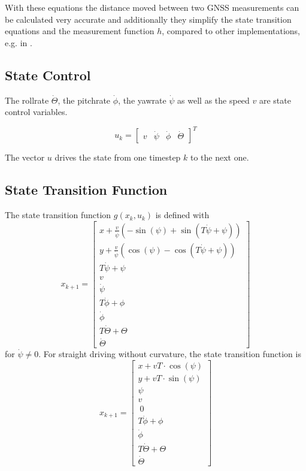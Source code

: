\documentclass[conference]{IEEEtran}
\begin{document}
With these equations the distance moved between two GNSS measurements can be calculated very accurate and additionally they simplify the state transition equations and the measurement function $h$, compared to other implementations, e.g. in \cite{Wender2008a}.

\subsection{State Control}

The rollrate $\dot \Theta$, the pitchrate $\dot \phi$, the yawrate $\dot \psi$ as well as the speed $v$ are state control variables.

\begin{equation}\label{controlinput}u_k=\left[\begin{matrix}v & \dot\psi & \dot\phi & \dot\Theta\end{matrix}\right]^T\end{equation}

The vector $u$ drives the state from one timestep $k$ to the next one.

\subsection{State Transition Function}

The state transition function $g(x_k, u_k)$ is defined with
\begin{equation}\label{statetransitionfunction}
x_{k+1}=\left[\begin{matrix}x + \frac{v}{\dot\psi} \left(- \sin{\left (\psi \right )} + \sin{\left (T \dot\psi + \psi \right )}\right)\\y + \frac{v}{\dot\psi} \left(\cos{\left (\psi \right )} - \cos{\left (T \dot\psi + \psi \right )}\right)\\T \dot\psi + \psi\\v\\\dot\psi\\T \dot\phi + \phi\\\dot\phi\\T \dot\Theta + \Theta\\\dot\Theta\end{matrix}\right]
\end{equation}
for $\dot \psi \neq 0$. For straight driving without curvature, the state transition function is
\begin{equation}
x_{k+1}=\left[\begin{matrix}x + v T \cdot \cos(\psi)\\y + v T \cdot \sin(\psi)\\ \psi \\v\\\ 0 \\T \dot\phi + \phi\\\dot\phi\\T \dot\Theta + \Theta\\\dot\Theta\end{matrix}\right]
\end{equation}
\end{document}
